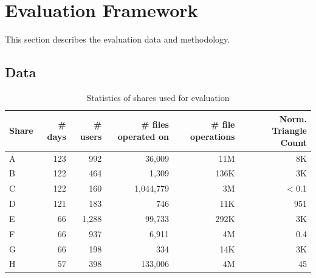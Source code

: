 \section{Evaluation Framework}
\label{sec:evaluation}
This section describes the evaluation data and methodology.

\subsection{Data}
\label{sec:data}
\begin{table}[!htpb]
\centering
{\fontsize{8pt}{1em}\selectfont
\begin{tabular}{|>{\centering}p{0.8cm}|r|r|r|r|r|}
\hline
\textbf{Share} & \textbf{\# days} & \textbf{\# users} & \textbf{\# files operated on} & \textbf{\# file operations} &\textbf{Norm. Triangle Count} \\
\hline
A & 123 & 992 & 36,009 & 11M &  8K \\ \hline
B & 122 & 464 & 1,309 & 136K &3K \\ \hline%
C & 122 & 160 & 1,044,779 & 3M &  $<$0.1\\ \hline
D & 121 & 183 & 746 & 11K & 951\\ \hline%
E & 66 &  1,288 & 99,733 & 292K &3K \\ \hline
F & 66 & 937 & 6,911 & 4M &0.4 \\ \hline
G & 66 & 198 & 334 & 14K  & 3K \\ \hline
H & 57 & 398 & 133,006 & 4M  &45\\  \hline
\end{tabular}
\caption{Statistics of shares used for evaluation 
} 
\label{tab:datasetstats1}
}
\end{table}

